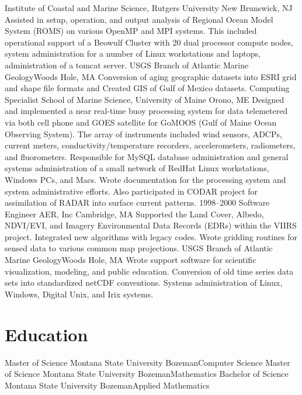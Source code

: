 \documentclass[11pt]{moderncv}  %
\begin{document}
{
	Institute of Coastal and Marine Science, Rutgers University}
    {New Brunswick, NJ}{} {
    Assisted in setup,  operation, and output analysis  of Regional
    Ocean Model System (ROMS) on various OpenMP and MPI systems.
    This included operational support of a Beowulf Cluster with 20
    dual processor compute nodes, system administration for a number
    of Linux workstations and laptops, administration of a tomcat
    server.
}
{
	USGS Branch of Atlantic Marine Geology}{Woods Hole, MA}{}{
    Conversion of aging geographic datasets into ESRI grid and shape
    file formats and Created GIS of Gulf of Mexico datasets.
}
{Computing Specialist}
{School of Marine Science, University of Maine}
{Orono, ME}{}
{
    Designed and implemented a near real-time buoy processing system
    for data telemetered via both cell phone and GOES satellite for
    GoMOOS (Gulf of Maine Ocean Observing System).   The array of
    instruments included wind sensors, ADCPs, current meters,
    conductivity/temperature recorders, accelerometers, radiometers,
    and fluorometers.   Responsible for MySQL database administration
    and general systems administration of a small network of RedHat
    Linux workstations, Windows PCs, and Macs.   Wrote documentation
    for the processing system and system administrative efforts.
    Also participated in CODAR project for assimilation of RADAR
    into surface current patterns.
}
\cventry
{1998--2000}
{Software Engineer}
{AER, Inc}
{Cambridge, MA}
{}
{
    Supported the Land Cover, Albedo, NDVI/EVI, and Imagery
    Environmental Data Records (EDRs) within the VIIRS project.
    Integrated new algorithms with legacy codes. Wrote gridding
    routines for sensed data to various common map projections.
}
    {USGS Branch of Atlantic Marine Geology}{Woods Hole, MA}{}{
    Wrote support software for scientific visualization, modeling,
    and public education. Conversion of old time series data sets
    into standardized netCDF conventions.  Systems administration
    of Linux, Windows, Digital Unix, and Irix systems.}

\section{Education}
    {Master of Science}
    {Montana State University}
    {Bozeman}{}{Computer Science}
    {Master of Science}
    {Montana State University}
    {Bozeman}{}{Mathematics}
    {Bachelor of Science}
    {Montana State University}
    {Bozeman}{}{Applied Mathematics}
\end{document}
